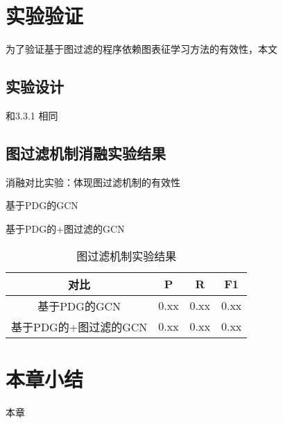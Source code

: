 \section{实验验证}
为了验证基于图过滤的程序依赖图表征学习方法的有效性，本文
\subsection{实验设计}
和3.3.1 相同
\subsection{图过滤机制消融实验结果}
消融对比实验：体现图过滤机制的有效性

基于PDG的GCN

基于PDG的+图过滤的GCN


\begin{table}
  \centering
  \caption{图过滤机制实验结果} %
  \begin{tabular*}{0.9\textwidth}{@{\extracolsep{\fill}}cccc}
  \toprule
    对比			&P		&R		&F1 \\
  \midrule
    基于PDG的GCN			&0.xx	&0.xx		&0.xx \\
    基于PDG的+图过滤的GCN			&0.xx		&0.xx		&0.xx \\
  \bottomrule
  \end{tabular*}
\end{table}

\section{本章小结}
本章



